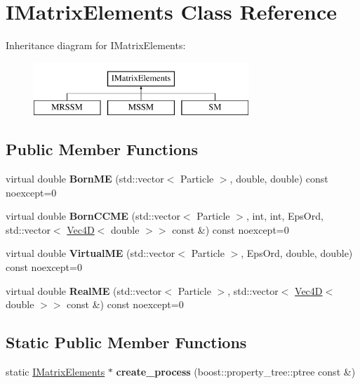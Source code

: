 \hypertarget{classIMatrixElements}{}\section{I\+Matrix\+Elements Class Reference}
\label{classIMatrixElements}
Inheritance diagram for I\+Matrix\+Elements\+:\begin{figure}[H]
\begin{center}
\leavevmode
\includegraphics[height=2.000000cm]{classIMatrixElements}
\end{center}
\end{figure}
\subsection*{Public Member Functions}
\begin{DoxyCompactItemize}
\item 
\mbox{\label{classIMatrixElements_a458dffa42a09708a69ba0aa7c6cb3476}} 
virtual double {\bfseries Born\+ME} (std\+::vector$<$ Particle $>$, double, double) const noexcept=0
\item 
\mbox{\label{classIMatrixElements_a8db0be3169c7a298a3a839f705bd078a}} 
virtual double {\bfseries Born\+C\+C\+ME} (std\+::vector$<$ Particle $>$, int, int, Eps\+Ord, std\+::vector$<$ \hyperlink{classVec4D}{Vec4D}$<$ double $>$$>$ const \&) const noexcept=0
\item 
\mbox{\label{classIMatrixElements_aec3e7e3b834a85e1db346fd5aaa53dae}} 
virtual double {\bfseries Virtual\+ME} (std\+::vector$<$ Particle $>$, Eps\+Ord, double, double) const noexcept=0
\item 
\mbox{\label{classIMatrixElements_a06fe3f65de1611596cb6e43c8168aa52}} 
virtual double {\bfseries Real\+ME} (std\+::vector$<$ Particle $>$, std\+::vector$<$ \hyperlink{classVec4D}{Vec4D}$<$ double $>$$>$ const \&) const noexcept=0
\end{DoxyCompactItemize}
\subsection*{Static Public Member Functions}
\begin{DoxyCompactItemize}
\item 
\mbox{\label{classIMatrixElements_af0cddd29f2a2d301f182509141a889ad}} 
static \hyperlink{classIMatrixElements}{I\+Matrix\+Elements} $\ast$ {\bfseries create\+\_\+process} (boost\+::property\+\_\+tree\+::ptree const \&)
\end{DoxyCompactItemize}
